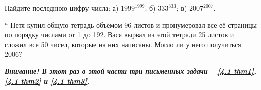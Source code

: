 \begin{thm}
    Найдите последнюю цифру числа: а) $1999^{1999}$; б) $333^{333}$; в) $2007^{2007}$.
\end{thm}

\begin{thm}$^n$ \label{4.1 thm3}
    Петя купил общую тетрадь объёмом 96 листов и пронумеровал все её страницы по порядку числами от 1 до 192. Вася вырвал из этой тетради 25 листов и сложил все 50 чисел, которые на них написаны. Могло ли у него получиться 2006?
\end{thm}

\textbf{\textit{Внимание! В этот раз в этой части три письменных задачи – \ref{4.1 thm1}, \ref{4.1 thm2} и \ref{4.1 thm3}.}}
    